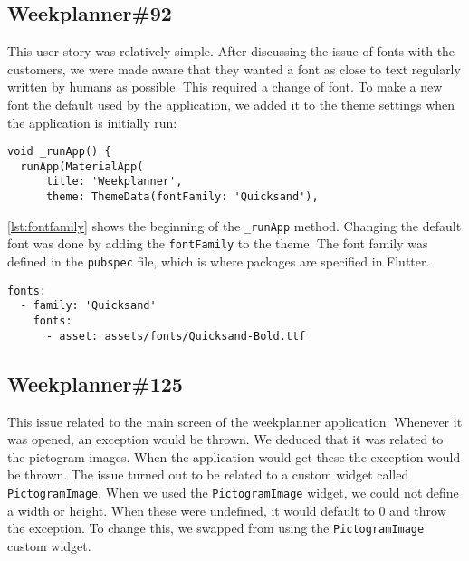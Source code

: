 \subsection{Weekplanner\#92}
This user story was relatively simple.
After discussing the issue of fonts with the customers, we were made aware that they wanted a font as close to text regularly written by humans as possible.
This required a change of font.
To make a new font the default used by the application, we added it to the theme settings when the application is initially run:

\begin{lstlisting}[caption={An excerpt of the run method},label={lst:fontfamily}]
  void _runApp() {
  runApp(MaterialApp(
      title: 'Weekplanner',
      theme: ThemeData(fontFamily: 'Quicksand'),
\end{lstlisting}
\autoref{lst:fontfamily} shows the beginning of the \texttt{\_runApp} method.
Changing the default font was done by adding the \texttt{fontFamily} to the theme.
The font family was defined in the \texttt{pubspec} file, which is where packages are specified in Flutter.
\begin{lstlisting}[caption={An excerpt of the pubspec file. Multiple assets are in the file for different styles, such as regular font.},label={lst:fontpubspec}]
  fonts:
  - family: 'Quicksand'
    fonts:
      - asset: assets/fonts/Quicksand-Bold.ttf
\end{lstlisting}
\subsection{Weekplanner\#125}
This issue related to the main screen of the weekplanner application.
Whenever it was opened, an exception would be thrown.
We deduced that it was related to the pictogram images. 
When the application would get these the exception would be thrown.
The issue turned out to be related to a custom widget called \texttt{PictogramImage}.
When we used the \texttt{PictogramImage} widget, we could not define a width or height.
When these were undefined, it would default to 0 and throw the exception.
To change this, we swapped from using the \texttt{PictogramImage} custom widget.

